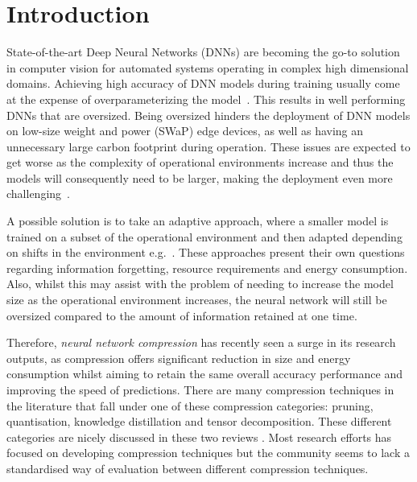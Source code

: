 \section{Introduction}

State-of-the-art Deep Neural Networks (DNNs) are becoming the go-to solution in computer vision for automated systems operating in complex high dimensional domains. 
%
Achieving high accuracy of DNN models during training usually come at the expense of overparameterizing the model~\cite{Neill2020}.
%
This results in well performing DNNs that are oversized. 
%
Being oversized hinders the deployment of DNN models on low-size weight and power (SWaP) edge devices, as well as having an unnecessary large carbon footprint during operation.
%
These issues are expected to get worse as the complexity of operational environments increase and thus the models will consequently need to be larger, making the deployment even more challenging~\cite{Marino2023, Brown2020}.  

A possible solution is to take an adaptive approach, where a smaller model is trained on a subset of the operational environment and then adapted depending on shifts in the environment e.g.~\cite{Ghobrial2022, mirza2022norm}.
%
These approaches present their own questions regarding information forgetting, resource requirements and energy consumption.
%
Also, whilst this may assist with the problem of needing to increase the model size as the operational environment increases,
the neural network will still be oversized compared to the amount of information retained at one time. 

Therefore, \textit{neural network compression} has recently seen a surge in its research outputs, as compression offers significant reduction in size and energy consumption whilst aiming to retain the same overall accuracy performance and improving the speed of predictions. 
%
There are many compression techniques in the literature that fall under one of these compression categories: pruning, quantisation, knowledge distillation and tensor decomposition. These different categories are nicely discussed in these two reviews \cite{Neill2020}\cite{Marino2023}.
%
Most research efforts has focused on developing compression techniques but the community seems to lack a standardised way of evaluation between different compression techniques.

